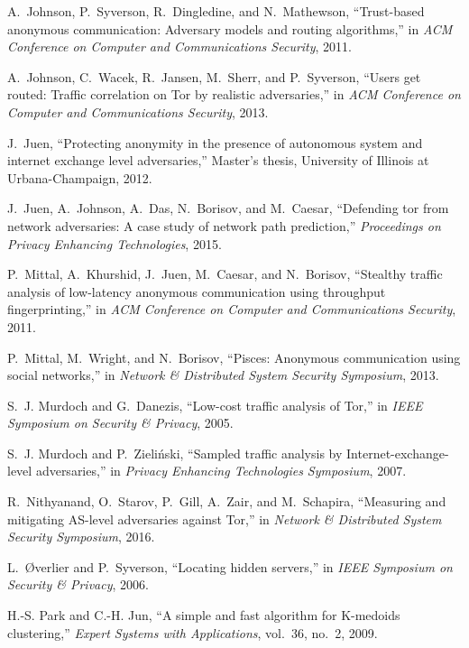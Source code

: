 \documentclass[conference]{styles/IEEEtran}
\begin{document}
{\begin{thebibliography}{10}
A.~Johnson, P.~Syverson, R.~Dingledine, and N.~Mathewson, ``Trust-based
  anonymous communication: Adversary models and routing algorithms,'' in
  \emph{ACM Conference on Computer and Communications Security}, 2011.

A.~Johnson, C.~Wacek, R.~Jansen, M.~Sherr, and P.~Syverson, ``Users get routed:
  Traffic correlation on {T}or by realistic adversaries,'' in \emph{ACM
  Conference on Computer and Communications Security}, 2013.

J.~Juen, ``Protecting anonymity in the presence of autonomous system and
  internet exchange level adversaries,'' Master's thesis, University of
  Illinois at Urbana-Champaign, 2012.

J.~Juen, A.~Johnson, A.~Das, N.~Borisov, and M.~Caesar, ``Defending tor from
  network adversaries: A case study of network path prediction,''
  \emph{Proceedings on Privacy Enhancing Technologies}, 2015.

P.~Mittal, A.~Khurshid, J.~Juen, M.~Caesar, and N.~Borisov, ``Stealthy traffic
  analysis of low-latency anonymous communication using throughput
  fingerprinting,'' in \emph{ACM Conference on Computer and Communications
  Security}, 2011.

P.~Mittal, M.~Wright, and N.~Borisov, ``Pisces: Anonymous communication using
  social networks,'' in \emph{Network \& Distributed System Security
  Symposium}, 2013.

S.~J. Murdoch and G.~Danezis, ``Low-cost traffic analysis of {T}or,'' in
  \emph{{IEEE} Symposium on Security \& Privacy}, 2005.

S.~J. Murdoch and P.~Zieli{\'n}ski, ``Sampled traffic analysis by
  {I}nternet-exchange-level adversaries,'' in \emph{Privacy Enhancing
  Technologies Symposium}, 2007.

R.~Nithyanand, O.~Starov, P.~Gill, A.~Zair, and M.~Schapira, ``Measuring and
  mitigating {AS}-level adversaries against {T}or,'' in \emph{Network \&
  Distributed System Security Symposium}, 2016.

L.~{\O}verlier and P.~Syverson, ``Locating hidden servers,'' in \emph{{IEEE}
  Symposium on Security \& Privacy}, 2006.

H.-S. Park and C.-H. Jun, ``{A simple and fast algorithm for K-medoids
  clustering},'' \emph{Expert Systems with Applications}, vol.~36, no.~2, 2009.


\end{thebibliography}}
\end{document}
